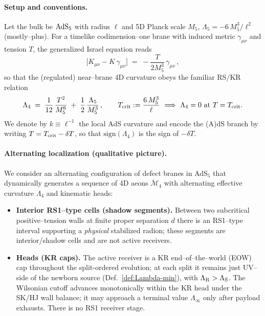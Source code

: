 \documentclass[10pt]{article}
\theoremstyle{definition}
\theoremstyle{plain}
\begin{document}
\paragraph{Setup and conventions.}\label{par:uom-main-097}
Let the bulk be ${\rm AdS}_5$ with radius \(\ell\) and 5D Planck scale \(M_5\), \(\Lambda_5=-6\,M_5^3/\ell^2\) (mostly–plus).
For a timelike codimension–one brane with induced metric \(\gamma_{\mu\nu}\) and tension \(T\), the generalized Israel equation reads
\begin{equation}
\big[K_{\mu\nu}-K\,\gamma_{\mu\nu}\big]\;=\;-\frac{T}{2M_5^3}\,\gamma_{\mu\nu}\,,
\end{equation}
so that the (regulated) near–brane 4D curvature obeys the familiar RS/KR relation
\begin{equation}
\Lambda_4\;=\;\frac{1}{12}\,\frac{T^2}{M_5^6}\;+\;\frac{1}{2}\,\frac{\Lambda_5}{M_5^3}\,,
\qquad 
T_{\rm crit}:=\frac{6\,M_5^3}{\ell}\ \Longrightarrow\ \Lambda_4=0\ \text{at }T=T_{\rm crit}.
\label{eq:L4-vs-T}
\end{equation}
We denote by \(k\equiv \ell^{-1}\) the local AdS curvature and encode the (A)dS branch by writing \(T=T_{\rm crit}-\delta T\), so that \(\mathrm{sign}(\Lambda_4)\) is the sign of \(-\delta T\).

\paragraph{Alternating localization (qualitative picture).}\label{par:uom-main-098}
We consider an alternating configuration of defect branes in AdS$_5$ that dynamically generates a
sequence of 4D aeons $\mathring{\mathcal M}_4$ with alternating effective curvature $\Lambda_4$ and
kinematic heads:
\begin{itemize}[leftmargin=1.6em]
\item \textbf{Interior RS1--type cells (shadow segments).} Between two subcritical positive--tension walls
at finite proper separation $d$ there is an RS1--type interval supporting a \emph{physical} stabilized
radion; these segments are interior/shadow cells and are not active receivers.
\item \textbf{Heads (KR caps).} The active receiver is a KR end--of--the--world (EOW) cap throughout the
split-ordered evolution; at each split it remains just UV--side of the newborn source
(Def.~\ref{def:Lambda-min}), with $\Lambda_{\rm R}>\Lambda_{\rm S}$. The Wilsonian cutoff
advances monotonically within the KR head under the SK/HJ wall balance; it may approach a terminal value
$\Lambda_\infty$ only after payload exhausts. There is no RS1 receiver stage.
\end{itemize}
\end{document}
